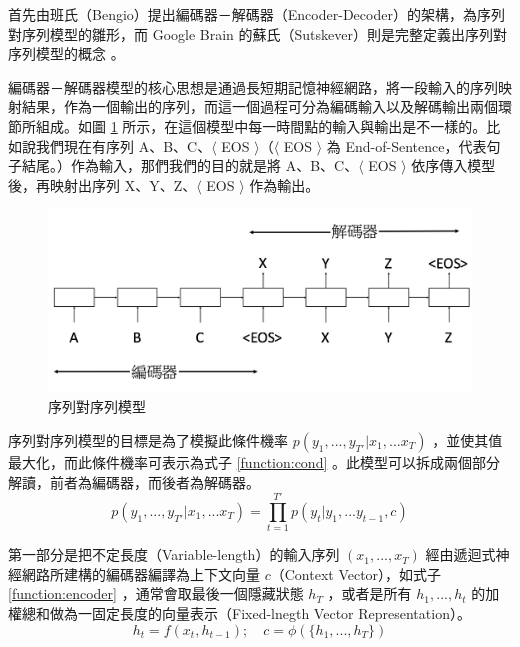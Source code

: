 首先由班氏（Bengio）提出編碼器－解碼器（Encoder-Decoder）的架構\cite{cho2014learning}，為序列對序列模型的雛形，而 Google Brain 的蘇氏（Sutskever）則是完整定義出序列對序列模型的概念 \cite{sutskever2014sequence} 。

編碼器－解碼器模型的核心思想是通過長短期記憶神經網路，將一段輸入的序列映射結果，作為一個輸出的序列，而這一個過程可分為編碼輸入以及解碼輸出兩個環節所組成。如圖 \ref{fig:seq2seq} 所示，在這個模型中每一時間點的輸入與輸出是不一樣的。比如說我們現在有序列 A、B、C、$\langle$ EOS $\rangle$（$\langle$ EOS $\rangle$ 為 End-of-Sentence，代表句子結尾。）作為輸入，那們我們的目的就是將 A、B、C、$\langle$ EOS $\rangle$ 依序傳入模型後，再映射出序列 X、Y、Z、$\langle$ EOS $\rangle$ 作為輸出。

\begin{figure}[h]
    \centering
    \includegraphics[scale=0.5]{images/chap2_seq2seq.png}
    \caption{序列對序列模型}\label{fig:seq2seq}
\end{figure}

序列對序列模型的目標是為了模擬此條件機率 $p(y_1,...,y_{T'}|x_1,...x_T)$ ，並使其值最大化，而此條件機率可表示為式子 \ref{function:cond} 。此模型可以拆成兩個部分解讀，前者為編碼器，而後者為解碼器。
\begin{equation}
    p(y_1,...,y_{T'}|x_1,...x_T) = \prod_{t=1}^{T'}p(y_t|y_1,...y_{t-1},c) \label{function:cond}
\end{equation}

第一部分是把不定長度（Variable-length）的輸入序列 $(x_1,...,x_T)$ 經由遞迴式神經網路所建構的編碼器編譯為上下文向量 $c$（Context Vector），如式子 \ref{function:encoder} ，通常會取最後一個隱藏狀態 $h_T$ ，或者是所有 $h_1,...,h_t$ 的加權總和做為一固定長度的向量表示（Fixed-lnegth Vector Representation）。
\begin{equation}
    h_t = f(x_t, h_{t-1});\quad  c = \phi(\{h_1,...,h_T\}) \label{function:encoder}
\end{equation}

